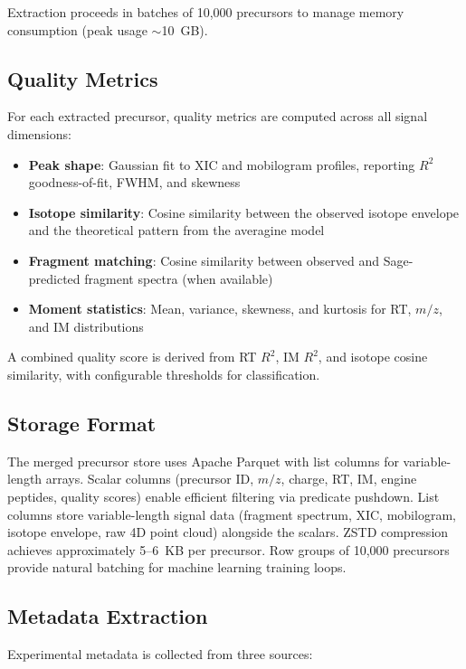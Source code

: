 \documentclass[10pt,twoside]{article}
\begin{document}
Extraction proceeds in batches of 10,000 precursors to manage memory consumption (peak usage $\sim$10~GB).

\subsection{Quality Metrics}

For each extracted precursor, quality metrics are computed across all signal dimensions:

\begin{itemize}
    \item \textbf{Peak shape}: Gaussian fit to XIC and mobilogram profiles, reporting $R^2$ goodness-of-fit, FWHM, and skewness
    \item \textbf{Isotope similarity}: Cosine similarity between the observed isotope envelope and the theoretical pattern from the averagine model
    \item \textbf{Fragment matching}: Cosine similarity between observed and Sage-predicted fragment spectra (when available)
    \item \textbf{Moment statistics}: Mean, variance, skewness, and kurtosis for RT, $m/z$, and IM distributions
\end{itemize}

A combined quality score is derived from RT $R^2$, IM $R^2$, and isotope cosine similarity, with configurable thresholds for classification.

\subsection{Storage Format}

The merged precursor store uses Apache Parquet with list columns for variable-length arrays.
Scalar columns (precursor ID, $m/z$, charge, RT, IM, engine peptides, quality scores) enable efficient filtering via predicate pushdown.
List columns store variable-length signal data (fragment spectrum, XIC, mobilogram, isotope envelope, raw 4D point cloud) alongside the scalars.
ZSTD compression achieves approximately 5--6~KB per precursor.
Row groups of 10,000 precursors provide natural batching for machine learning training loops.

\subsection{Metadata Extraction}

Experimental metadata is collected from three sources:
\end{document}
